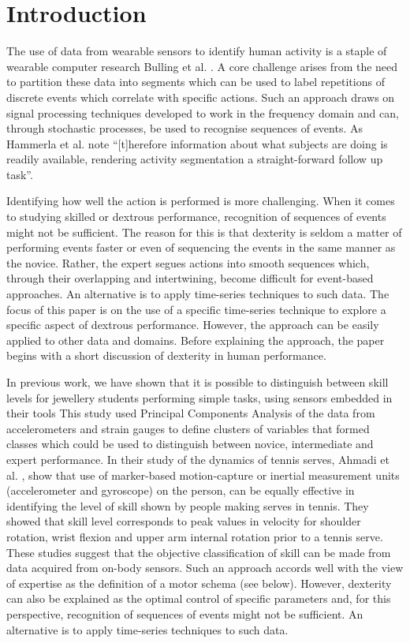 \documentclass{sigchi}
\begin{document}


\section{Introduction}

The use of data from wearable sensors to identify human activity is a staple of wearable computer research 
Bulling et al. \cite{Bulling2014}. A core challenge arises from the need to partition these data into segments 
which can be used to label repetitions of discrete events which correlate with specific actions. 
Such an approach draws on signal processing techniques developed to work in the frequency domain and can, 
through stochastic processes, be used to recognise sequences of events.  As Hammerla et al. \cite{Hammerla2011}
note ``[t]herefore information about what subjects are doing is readily available, rendering activity 
segmentation a straight-forward follow up task''. 

Identifying how well the action is performed is more 
challenging. When it comes to studying skilled or dextrous performance, recognition of sequences of events 
might not be sufficient. The reason for this is that dexterity is seldom a matter of performing events 
faster or even of sequencing the events in the same manner as the novice. Rather, the expert segues actions 
into smooth sequences which, through their overlapping and intertwining, become difficult for event-based 
approaches. An alternative is to apply time-series techniques to such data. The focus of this paper is on 
the use of a specific time-series technique to explore a specific aspect of dextrous performance. 
However, the approach can be easily applied to other data and domains. Before explaining the approach, 
the paper begins with a short discussion of dexterity in human performance.

In previous work, we have shown that it is possible to distinguish between skill levels for jewellery 
students performing simple tasks, using sensors embedded in their tools \cite{RefXXX}
This study used Principal Components Analysis of the data from accelerometers and strain gauges to define 
clusters of variables that formed classes which could be used to distinguish between novice, intermediate 
and expert performance.  In their study of the dynamics of tennis serves,  Ahmadi et al. \cite{Ahmadi2010}, 
show that use of marker-based motion-capture or inertial measurement units (accelerometer and gyroscope) 
on the person, can be equally effective in identifying the level of skill shown by people making serves 
in tennis.  They showed that skill level corresponds to peak values in velocity for shoulder rotation, 
wrist flexion and upper arm internal rotation prior to a tennis serve. These studies suggest that the objective 
classification of skill can be made from data acquired from on-body sensors. 
Such an approach accords well with the view of expertise as the definition of a motor schema (see below). 
However, dexterity can also be explained as the optimal control of specific parameters and, for this perspective, 
recognition of sequences of events might not be sufficient. 
An alternative is to apply time-series techniques to such data.
\end{document}
